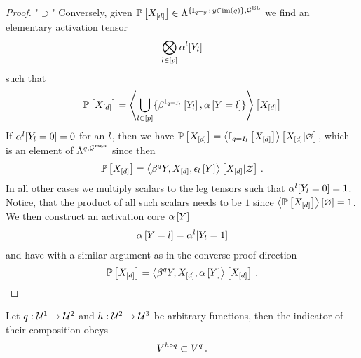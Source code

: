 \begin{proof}
    "$\supset$"
    Conversely, given $\mathbb{P}\left[X_{[d]}\right]\in\Lambda^{\{\mathbb{I}_{q=y}\,:\,y\in\mathrm{im}\left(q\right)\},\mathcal{G}^{\mathrm{EL}}}$ we find an elementary activation tensor
    \begin{align*}
        \bigotimes_{l\in[p]}\alpha^{l}[Y_{l}]
    \end{align*}
    such that
    \begin{align*}
        \mathbb{P}\left[X_{[d]}\right] = \left\langle \bigcup_{l\in[p]}\{\beta^{\mathbb{I}_{q=I_{l}}}\left[Y_{l}\right],\alpha\left[Y=l\right]\}\right\rangle \left[ X_{[d]} \right]
    \end{align*}
    If $\alpha^{l}[Y_{l}=0]=0$ for an $l$, then we have $\mathbb{P}\left[X_{[d]}\right]=\left\langle \mathbb{I}_{q=I_{l}}\left[X_{[d]}\right]\right\rangle \left[ X_{[d]} | \varnothing \right]$, which is an element of $\Lambda^{q,\mathcal{G}^{\mathrm{max}}}$ since then
    \begin{align*}
        \mathbb{P}\left[X_{[d]}\right] = \left\langle \beta^{q}{Y,X_{[d]}},\epsilon_{l}\left[Y\right]\right\rangle \left[ X_{[d]} | \varnothing \right] \, .
    \end{align*}
    In all other cases we multiply scalars to the leg tensors such that $\alpha^{l}[Y_{l}=0]=1$.
    Notice, that the product of all such scalars needs to be $1$ since $\left\langle \mathbb{P}\left[X_{[d]}\right]\right\rangle \left[ \varnothing \right]=1$.
    We then construct an activation core $\alpha\left[Y\right]$
    \begin{align*}
        \alpha\left[Y=l\right] = \alpha^{l}[Y_{l}=1]
    \end{align*}
    and have with a similar argument as in the converse proof direction
    \begin{align*}
        \mathbb{P}\left[X_{[d]}\right] = \left\langle \beta^{q}{Y,X_{[d]}},\alpha\left[Y\right]\right\rangle \left[ X_{[d]} \right] \, .
    \end{align*}
\end{proof}



Let $q: \mathcal{U}^{1}\rightarrow\mathcal{U}^{2}$ and $h:\mathcal{U}^{2}\rightarrow\mathcal{U}^{3}$ be arbitrary functions, then the indicator of their composition obeys
\begin{align*}
    V^{h\circ q} \subset V^{q} \, .
\end{align*}


